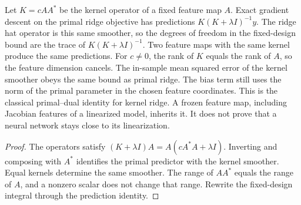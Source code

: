 \begin{lemma}\label{lem:kernel_ridge}
\leanok
{}
Let $K=cAA^*$ be the kernel operator of a fixed feature map $A$. Exact gradient
descent on the primal ridge objective has predictions $K(K+\lambda I)^{-1}y$.
The ridge hat operator is this same smoother, so the degrees of freedom in the
fixed-design bound are the trace of $K(K+\lambda I)^{-1}$. Two feature maps
with the same kernel produce the same predictions. For $c\neq 0$, the rank of
$K$ equals the rank of $A$, so the feature dimension cancels. The in-sample
mean squared error of the kernel smoother obeys the same bound as primal ridge.
The bias term still uses the norm of the primal parameter in the chosen feature
coordinates. This is the classical primal--dual identity for kernel ridge. A
frozen feature map, including Jacobian features of a linearized model, inherits
it. It does not prove that a neural network stays close to its linearization.
\end{lemma}
\begin{proof}
\leanok
The operators satisfy $(K+\lambda I)A=A(cA^*A+\lambda I)$. Inverting and
composing with $A^*$ identifies the primal predictor with the kernel smoother.
Equal kernels determine the same smoother. The range of $AA^*$ equals the range
of $A$, and a nonzero scalar does not change that range. Rewrite the
fixed-design integral through the prediction identity.
\end{proof}

